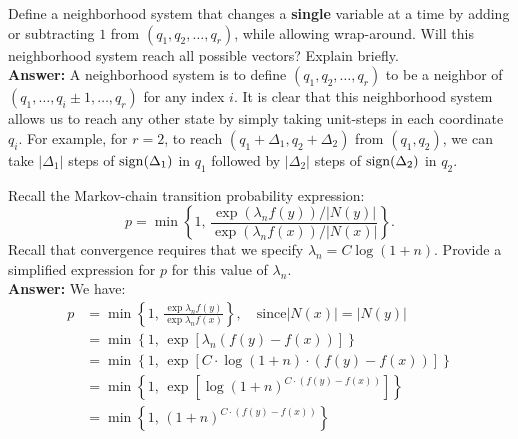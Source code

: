 \documentclass[12pt,legalpaper]{article}
\begin{document}
 Define a neighborhood system that changes
  a {\bf single} variable at a time by adding or subtracting $1$
  from $(q_1, q_2, \dots, q_r)$, while allowing wrap-around.
  Will this neighborhood system reach all possible vectors?
  Explain briefly. \\
  
  {\bf Answer:} A neighborhood system is to define $(q_1, q_2, \dots, q_r)$
   to be a neighbor of $(q_1, \dots, q_i \pm 1, \dots, q_r)$ for any index $i$.
   It is clear that this neighborhood system allows us to reach any other state
   by simply taking unit-steps in each coordinate $q_i$. For example, for $r=2$,
    to reach $(q_1 + \Delta_1, q_2 + \Delta_2)$ from $(q_1, q_2)$, we can take
    $|\Delta_1|$ steps of ${\rm sign}(\Delta_1)$ in $q_1$ followed by
    $|\Delta_2|$ steps of ${\rm sign}(\Delta_2)$ in $q_2$.
  
 Recall the Markov-chain transition probability
expression: 
  \begin{equation*}
      p = \min \left\{1, \,
                 \frac{\exp{(\lambda_n f(y))}/|N(y)|}{
                          \exp{(\lambda_n f(x))}/|N(x)|}
              \right\}.
  \end{equation*}
Recall that convergence requires that we specify $\lambda_n=C \log(1+n)$.
Provide a simplified expression for $p$ for this value of $\lambda_n$.\\

{\bf Answer:} We have:
\begin{align*}
  p &= \min \left\{1, \, 
               \frac{\exp{\lambda_n f(y)}}{\exp{\lambda_n f(x)}} 
                   \right\}, \quad \text{since} |N(x)| = |N(y)| \\
      &= \min \left\{1, \,   
                       \exp \left [
                           \lambda_n (f(y) - f(x))
                           \right ]
                       \right\} \\ 
      &= \min \left\{1, \,   
                       \exp \left [
                           C \cdot \log(1+n) \cdot (f(y) - f(x))
                           \right ]
                       \right\} \\
      &= \min \left\{1, \,   
                       \exp \left [
                             \log (1+n)^ {C \cdot (f(y) - f(x))}  
                               \right ]
                       \right\} \\                 
&= \min \left\{1, \,   
                       (1+n)^ {C \cdot (f(y) - f(x))}  
             \right\}                        
\end{align*}
\end{document}
